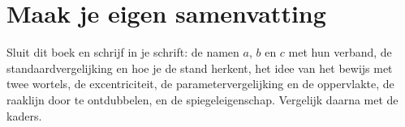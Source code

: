 \begin{oefeningen}




\end{oefeningen}


\ifzelfstudie
\section*{Maak je eigen samenvatting}
Sluit dit boek en schrijf in je schrift: de namen $a$, $b$ en $c$ met hun verband, de standaardvergelijking en hoe je de stand herkent, het idee van het bewijs met twee wortels, de excentriciteit, de parametervergelijking en de oppervlakte, de raaklijn door te ontdubbelen, en de spiegeleigenschap. Vergelijk daarna met de kaders.
\fi

